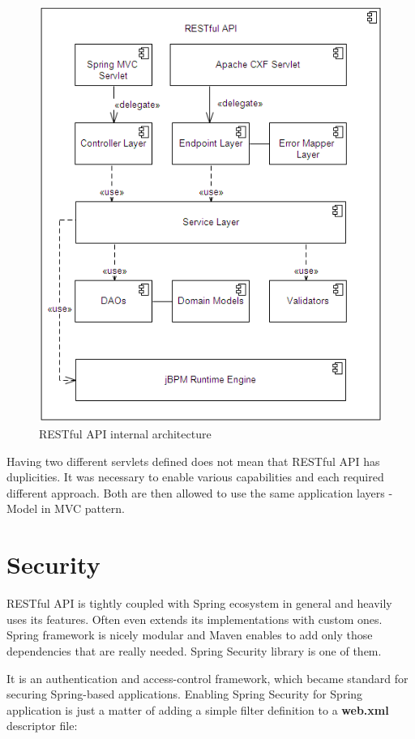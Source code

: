 	\begin{figure}[h]
	  	\centering
	    \includegraphics[width=12cm]{figures/restful_api_architecture.png}
	  	\caption{RESTful API internal architecture}
	\end{figure}
	
	Having two different servlets defined does not mean that RESTful API has duplicities. It was necessary to enable
	various capabilities and each required different approach. Both are then allowed to use the same application layers -
	Model in MVC pattern.
	
	\section{Security}\label{sec:security}
	
	RESTful API is tightly coupled with Spring ecosystem in general and heavily uses its features. Often even extends its
	implementations with custom ones. Spring framework is nicely modular and Maven enables to add only those dependencies
	that are really needed. Spring Security library is one of them.
	
	It is an authentication and access-control framework, which became standard for securing Spring-based applications.
	Enabling Spring Security for Spring application is just a matter of adding a simple filter definition to a
	\textbf{web.xml} descriptor file:
	
